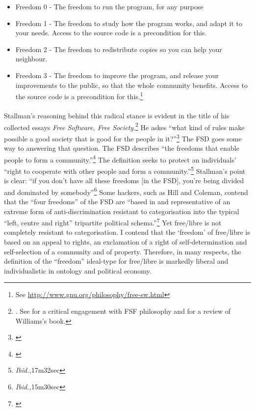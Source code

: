 \documentclass[11pt,titlepage]{book}
\begin{document}
\begin{itemize}
\item Freedom 0 - The freedom to run the program, for any purpose
\item Freedom 1 - The freedom to study how the program works, and adapt it to your needs. Access to the source code is a precondition for this.
\item Freedom 2 - The freedom to redistribute copies so you can help your neighbour.
\item Freedom 3 - The freedom to improve the program, and release your improvements to the public, so that the whole community benefits. Access to the source code is a precondition for this.\footnote{See \url{http://www.gnu.org/philosophy/free-sw.html}}
\end{itemize}

\paragraph{}Stallman's reasoning behind this radical stance is evident in the title of his collected essays \textit{Free Software, Free Society}.\footnote{\cite{Stallman:2002xy}. See \cite{Williams:2007uq} for a critical engagement with FSF philosophy and \cite{Stallabrass:2002kx} for a review of Williams's book.} He askes ``what kind of rules make possible a good society that is good for the people in it?''\footnote{\cite[Ch. 8]{Williams:2007uq}} The FSD goes some way to answering that question. The FSD describes ``the freedoms that enable people to form a community.''\footnote{\cite[15m30sec]{moore:2002rv}} The definition seeks to protect an individuals' ``right to cooperate with other people and form a community.''\footnote{\textit{Ibid.,}17m32sec} Stallman's point is clear: ``if you don't have all these freedoms [in the FSD], you're being divided and dominated by somebody''\footnote{\textit{Ibid.,}15m30sec} Some hackers, such as Hill and Coleman, contend that the ``four freedoms'' of the FSD are ``based in and representative of an extreme form of anti-discrimination resistant to categorisation into the typical ``left, centre and right'' tripartite political schema.''\footnote{\cite{coleman:2004fo}} Yet free/libre is not completely resistant to categorisation. I contend that the `freedom' of free/libre is based on an appeal to rights, an exclamation of a right of self-determination and self-selection of a community and of property. Therefore, in many respects, the definition of the ``freedom'' ideal-type for free/libre is markedly liberal and individualistic in ontology and political economy.
\end{document}
